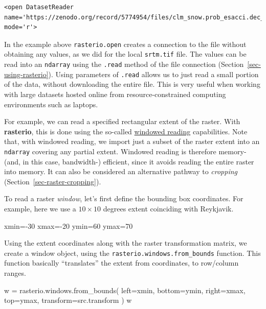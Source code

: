 \documentclass[
  letterpaper,
]{krantz}
\newenvironment{Shaded}{\begin{snugshade}}{\end{snugshade}}
\newcommand{\DecValTok}[1]{\textcolor[rgb]{0.68,0.00,0.00}{#1}}
\newcommand{\NormalTok}[1]{\textcolor[rgb]{0.00,0.23,0.31}{#1}}
\newcommand{\OperatorTok}[1]{\textcolor[rgb]{0.37,0.37,0.37}{#1}}
\begin{document}
\begin{verbatim}
<open DatasetReader name='https://zenodo.org/record/5774954/files/clm_snow.prob_esacci.dec_p.90_500m_s0..0cm_2000..2012_v2.0.tif' mode='r'>
\end{verbatim}

In the example above \texttt{rasterio.open} creates a connection to the
file without obtaining any values, as we did for the local
\texttt{srtm.tif} file. The values can be read into an \texttt{ndarray}
using the \texttt{.read} method of the file connection
(Section~\ref{sec-using-rasterio}). Using parameters of \texttt{.read}
allows us to just read a small portion of the data, without downloading
the entire file. This is very useful when working with large datasets
hosted online from resource-constrained computing environments such as
laptops.

For example, we can read a specified rectangular extent of the raster.
With \textbf{rasterio}, this is done using the so-called
\href{https://rasterio.readthedocs.io/en/latest/topics/windowed-rw.html}{windowed
reading} capabilities. Note that, with windowed reading, we import just
a subset of the raster extent into an \texttt{ndarray} covering any
partial extent. Windowed reading is therefore memory- (and, in this
case, bandwidth-) efficient, since it avoids reading the entire raster
into memory. It can also be considered an alternative pathway to
\emph{cropping} (Section~\ref{sec-raster-cropping}).

To read a raster \emph{window}, let's first define the bounding box
coordinates. For example, here we use a \(10 \times 10\) degrees extent
coinciding with Reykjavik.

\begin{Shaded}
\begin{Highlighting}[]
\NormalTok{xmin}\OperatorTok{={-}}\DecValTok{30}
\NormalTok{xmax}\OperatorTok{={-}}\DecValTok{20}
\NormalTok{ymin}\OperatorTok{=}\DecValTok{60}
\NormalTok{ymax}\OperatorTok{=}\DecValTok{70}
\end{Highlighting}
\end{Shaded}

Using the extent coordinates along with the raster transformation
matrix, we create a window object, using the
\texttt{rasterio.windows.from\_bounds} function. This function basically
``translates'' the extent from coordinates, to row/column ranges.

\begin{Shaded}
\begin{Highlighting}[]
\NormalTok{w }\OperatorTok{=}\NormalTok{ rasterio.windows.from\_bounds(}
\NormalTok{    left}\OperatorTok{=}\NormalTok{xmin, }
\NormalTok{    bottom}\OperatorTok{=}\NormalTok{ymin,}
\NormalTok{    right}\OperatorTok{=}\NormalTok{xmax,}
\NormalTok{    top}\OperatorTok{=}\NormalTok{ymax, }
\NormalTok{    transform}\OperatorTok{=}\NormalTok{src.transform}
\NormalTok{)}
\NormalTok{w}
\end{Highlighting}
\end{Shaded}
\end{document}
